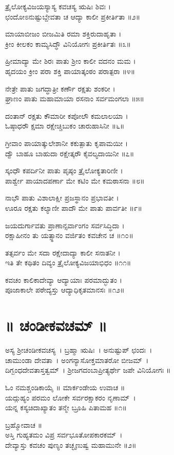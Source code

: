 ತ್ರೈಲೋಕ್ಯವಿಜಯಸ್ಯಾಸ್ಯ ಕವಚಸ್ಯ ಋಷಿಃ ಶಿವಃ ।\\
ಛಂದೋಽನುಷ್ಟುಬ್ದೇವತಾ ಚ ಆದ್ಯಾ ಕಾಲೀ ಪ್ರಕೀರ್ತಿತಾ ॥೨॥

ಮಾಯಾಬೀಜಂ ಬೀಜಮಿತಿ ರಮಾ ಶಕ್ತಿರುದಾಹೃತಾ ।\\
ಕ್ರೀಂ ಕೀಲಕಂ ಕಾಮ್ಯಸಿದ್ಧೌ ವಿನಿಯೋಗಃ ಪ್ರಕೀರ್ತಿತಃ ॥೩॥

ಹ್ರೀಮಾದ್ಯಾ ಮೇ ಶಿರಃ ಪಾತು ಶ್ರೀಂ ಕಾಲೀ ವದನಂ ಮಮ ।\\
ಹೃದಯಂ ಕ್ರೀಂ ಪರಾ ಶಕ್ತಿ ಪಾಯಾತ್ಕಂಠಂ ಪರಾತ್ಪರಾ ॥೪॥

ನೇತ್ರೇ ಪಾತು ಜಗದ್ಧಾತ್ರೀ ಕರ್ಣೌ ರಕ್ಷತು ಶಂಕರೀ ।\\
ಘ್ರಾಣಂ ಪಾತು ಮಹಾಮಾಯಾ ರಸನಾಂ ಸರ್ವಮಂಗಲಾ ॥೫॥

ದಂತಾನ್ ರಕ್ಷತು ಕೌಮಾರೀ ಕಪೋಲೌ ಕಮಲಾಲಯಾ ।\\
ಓಷ್ಠಾಧರೌ ಕ್ಷಮಾ ರಕ್ಷೇಚ್ಚಿಬುಕಂ ಚಾರುಹಾಸಿನೀ ॥೬॥

ಗ್ರೀವಾಂ ಪಾಯಾತ್ಕುಲೇಶಾನೀ ಕಕುತ್ಪಾತು ಕೃಪಾಮಯೀ ।\\
ದ್ವೌ ಬಾಹೂ ಬಾಹುದಾ ರಕ್ಷೇತ್ಕರೌ ಕೈವಲ್ಯದಾಯಿನೀ ॥೭॥

ಸ್ಕಂಧೌ ಕಪರ್ದಿನೀ ಪಾತು ಪೃಷ್ಠಂ ತ್ರೈಲೋಕ್ಯತಾರಿಣೀ ।\\
ಪಾರ್ಶ್ವೇ ಪಾಯಾದಪರ್ಣಾ ಮೇ ಕಟಿಂ ಮೇ ಕಮಠಾಸನಾ ॥೮॥

ನಾಭೌ ಪಾತು ವಿಶಾಲಾಕ್ಷೀ ಪ್ರಜಸ್ಥಾನಂ ಪ್ರಭಾವತೀ ।\\
ಊರೂ ರಕ್ಷತು ಕಲ್ಯಾಣೀ ಪಾದೌ ಮೇ ಪಾತು ಪಾರ್ವತೀ ॥೯॥

ಜಯದುರ್ಗಾವತು ಪ್ರಾಣಾನ್ಸರ್ವಾಂಗಂ ಸರ್ವಸಿದ್ಧಿದಾ ।\\
ರಕ್ಷಾಹೀನಂ ತು ಯತ್ಸ್ಥಾನಂ ವರ್ಜಿತಂ ಕವಚೇನ ಚ ॥೧೦॥

ತತ್ಸರ್ವಂ ಮೇ ಸದಾ ರಕ್ಷೇದಾದ್ಯಾ ಕಾಲೀ ಸನಾತನೀ ।\\
ಇತಿ ತೇ ಕಥಿತಂ ದಿವ್ಯಂ ತ್ರೈಲೋಕ್ಯವಿಜಯಾಭಿಧಂ ॥೧೧॥

ಕವಚಂ ಕಾಲಿಕಾದೇವ್ಯಾ ಆದ್ಯಾಯಾಃ ಪರಮಾದ್ಭುತಂ ।\\
ಪೂಜಾಕಾಲೇ ಪಠೇದ್ಯಸ್ತು ಆದ್ಯಾಧಿಕೃತಮಾನಸಃ ॥೧೨॥
\section{॥ ಚಂಡೀಕವಚಮ್ ॥}
ಅಸ್ಯ ಶ್ರೀಚಂಡೀಕವಚಸ್ಯ~। ಬ್ರಹ್ಮಾ ಋಷಿಃ~। ಅನುಷ್ಟುಪ್ ಛಂದಃ~।\\ ಚಾಮುಂಡಾ ದೇವತಾ~। ಅಂಗನ್ಯಾಸೋಕ್ತಮಾತರೋ ಬೀಜಮ್~।\\ದಿಗ್ಬಂಧದೇವತಾಸ್ತತ್ವಮ್~। ಶ್ರೀಜಗದಂಬಾಪ್ರೀತ್ಯರ್ಥೇ ಜಪೇ ವಿನಿಯೋಗಃ ॥

ಓಂ ನಮಶ್ಚಂಡಿಕಾಯೈ ॥ ಮಾರ್ಕಂಡೇಯ ಉವಾಚ ॥\\
ಯದ್ಗುಹ್ಯಂ ಪರಮಂ ಲೋಕೇ ಸರ್ವರಕ್ಷಾಕರಂ ನೃಣಾಮ್~।\\
ಯನ್ನ ಕಸ್ಯಚಿದಾಖ್ಯಾತಂ ತನ್ಮೇ ಬ್ರೂಹಿ ಪಿತಾಮಹ ॥೧॥

ಬ್ರಹ್ಮೋವಾಚ ॥\\
ಅಸ್ತಿ ಗುಹ್ಯತಮಂ ವಿಪ್ರ ಸರ್ವಭೂತೋಪಕಾರಕಮ್~।\\
ದೇವ್ಯಾಸ್ತು ಕವಚಂ ಪುಣ್ಯಂ ತಚ್ಛೃಣುಷ್ವ ಮಹಾಮುನೇ ॥೨॥

